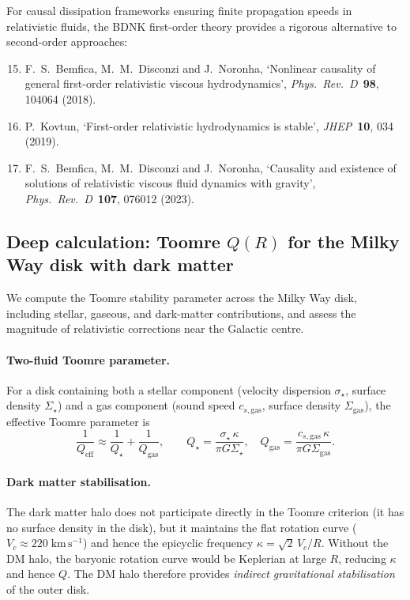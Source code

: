 \noindent
For causal dissipation frameworks ensuring finite propagation speeds in
relativistic fluids, the BDNK first-order theory provides a rigorous
alternative to second-order approaches:

\begin{enumerate}
\setcounter{enumi}{14}
\item F.~S.~Bemfica, M.~M.~Disconzi and J.~Noronha, `Nonlinear
  causality of general first-order relativistic viscous hydrodynamics',
  \textit{Phys.\ Rev.\ D}\ \textbf{98}, 104064 (2018).
\item P.~Kovtun, `First-order relativistic hydrodynamics is stable',
  \textit{JHEP}\ \textbf{10}, 034 (2019).
\item F.~S.~Bemfica, M.~M.~Disconzi and J.~Noronha, `Causality and
  existence of solutions of relativistic viscous fluid dynamics with
  gravity', \textit{Phys.\ Rev.\ D}\ \textbf{107}, 076012 (2023).
\end{enumerate}

\subsection*{Deep calculation: Toomre $Q(R)$ for the Milky Way disk
  with dark matter}
\label{subsec:rel-120-deep-toomre-mw}

We compute the Toomre stability parameter across the Milky Way disk,
including stellar, gaseous, and dark-matter contributions, and assess
the magnitude of relativistic corrections near the Galactic centre.

\paragraph{Two-fluid Toomre parameter.}
For a disk containing both a stellar component (velocity dispersion
$\sigma_{\star}$, surface density $\Sigma_{\star}$) and a gas
component (sound speed $c_{s,\mathrm{gas}}$, surface density
$\Sigma_{\mathrm{gas}}$), the effective Toomre parameter is
\begin{equation}
\label{eq:rel-13-Qeff}
\frac{1}{Q_{\mathrm{eff}}}
  \approx \frac{1}{Q_{\star}} + \frac{1}{Q_{\mathrm{gas}}},
  \qquad
  Q_{\star} = \frac{\sigma_{\star}\,\kappa}{\pi G\Sigma_{\star}},
  \quad
  Q_{\mathrm{gas}} = \frac{c_{s,\mathrm{gas}}\,\kappa}{\pi G\Sigma_{\mathrm{gas}}}.
\end{equation}

\paragraph{Dark matter stabilisation.}
The dark matter halo does not participate directly in the Toomre
criterion (it has no surface density in the disk), but it maintains
the flat rotation curve ($V_{c} \approx 220\;\mathrm{km\,s^{-1}}$)
and hence the epicyclic frequency
$\kappa = \sqrt{2}\,V_{c}/R$.  Without the DM halo, the baryonic
rotation curve would be Keplerian at large $R$, reducing $\kappa$
and hence $Q$.  The DM halo therefore provides \emph{indirect
gravitational stabilisation} of the outer disk.

